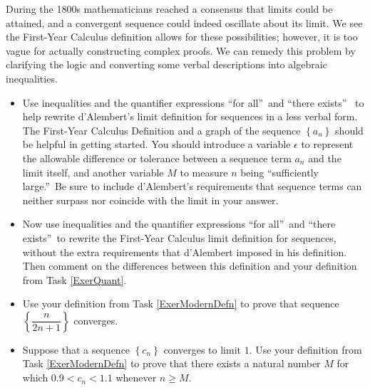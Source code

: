 \documentclass[11pt]{article}%
\newcounter{tasknumb}
\newcommand{\tasknumb}[1]{\refstepcounter{tasknumb}\textmd{\textbf{$\fbox{$\fbox{Task \thetasknumb}$}$}}#1}
\newenvironment{task}[1][]%
{\begin{itemize}
\item[\tasknumb{#1}] }
{
\end{itemize} }%
\begin{document}
During the 1800s mathematicians reached a consensus that limits could be
attained, and a convergent sequence could indeed oscillate about its limit. We
see the First-Year Calculus definition allows for these possibilities;
however, it is too vague for actually constructing complex proofs. We can
remedy this problem by clarifying the logic and converting some verbal
descriptions into algebraic inequalities.




\begin{task}[\label{ExerQuant}] Use  inequalities and the quantifier expressions  \textquotedblleft for
all\textquotedblright\ and \textquotedblleft there exists\textquotedblright%
\  to help rewrite d'Alembert's limit
definition for sequences in a less verbal form. The First-Year Calculus Definition and a graph of the
sequence $\left\{  a_{n}\right\}  $ should be helpful in getting started. You should introduce a
variable $\epsilon$ to represent the allowable difference or tolerance between a sequence term $a_{n}$ and the limit itself, and another
variable $M$ to measure $n$ being \textquotedblleft sufficiently large.\textquotedblright \ Be sure to include
d'Alembert's requirements that sequence terms can neither surpass nor coincide with the limit in your answer.
\end{task}



\begin{task}
[\label{ExerModernDefn}]Now use  inequalities and the quantifier expressions  \textquotedblleft for
all\textquotedblright\ and \textquotedblleft there exists\textquotedblright \ to rewrite the First-Year Calculus limit definition for
sequences, without the extra requirements that d'Alembert imposed in his definition. Then comment on the differences between this definition and your
definition from Task \ref{ExerQuant}.
\end{task}



\begin{task}
Use your definition from Task \ref{ExerModernDefn} to prove that sequence
$\left\{  \dfrac{n}{2n+1}\right\}  $ converges.
\end{task}


\begin{task}
[\label{ExerLimExists}]Suppose that a sequence $\left\{  c_{n}\right\}  $
converges to limit $1.$ Use your definition from Task \ref{ExerModernDefn} to
prove that there exists a natural number $M$ for which $0.9<c_{n}<1.1$
whenever $n\geq M$.
\end{task}
\end{document}
